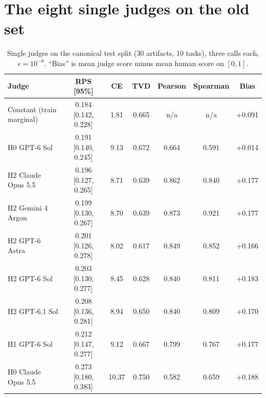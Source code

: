 \section{The eight single judges on the old set}
\label{app:eight}
\begin{table}[H]
\caption{Single judges on the canonical test split (30 artifacts, 10 tasks), three calls each, $\epsilon=10^{-6}$. ``Bias'' is mean judge score minus mean human score on $[0,1]$.}
\centering\footnotesize
\begin{tabular}{lcccccc}
\toprule
Judge & RPS [95\%] & CE & TVD & Pearson & Spearman & Bias\\
\midrule
Constant (train marginal) & 0.184 [0.142, 0.228] & 1.81 & 0.665 & n/a & n/a & +0.091\\
H0 GPT-6 Sol & 0.191 [0.140, 0.245] & 9.13 & 0.672 & 0.664 & 0.591 & +0.014\\
H2 Claude Opus 5.5 & 0.196 [0.127, 0.265] & 8.71 & 0.639 & 0.862 & 0.840 & +0.177\\
H2 Gemini 4 Argon & 0.199 [0.130, 0.267] & 8.70 & 0.639 & 0.873 & 0.921 & +0.177\\
H2 GPT-6 Astra & 0.201 [0.126, 0.278] & 8.02 & 0.617 & 0.849 & 0.852 & +0.166\\
H2 GPT-6 Sol & 0.203 [0.130, 0.277] & 8.45 & 0.628 & 0.840 & 0.811 & +0.183\\
H2 GPT-6.1 Sol & 0.208 [0.136, 0.281] & 8.94 & 0.650 & 0.840 & 0.809 & +0.170\\
H1 GPT-6 Sol & 0.212 [0.147, 0.277] & 9.12 & 0.667 & 0.799 & 0.767 & +0.177\\
H0 Claude Opus 5.5 & 0.273 [0.180, 0.383] & 10.37 & 0.750 & 0.582 & 0.659 & +0.188\\
\bottomrule
\end{tabular}
\end{table}


